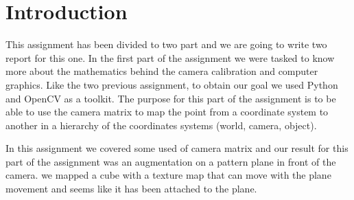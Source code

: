 \pagebreak{}
\section{Introduction}

This assignment has been divided to two part and we are going to write two report for this one. In the first part of the assignment we were tasked to know more about the mathematics behind the camera calibration and computer graphics. Like the two previous assignment, to obtain our goal we used Python and OpenCV as a toolkit. The purpose for this part of the assignment is to be able to use the camera matrix to map the point from a coordinate system to another in a hierarchy of the coordinates systems (world, camera, object).

In this assignment we covered some used of camera matrix and our result for this part of the assignment was an augmentation on a pattern plane in front of the camera. we mapped a cube with a texture map that can move with the plane movement and seems like it has been attached to the plane.

